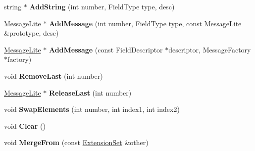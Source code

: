 \begin{DoxyCompactItemize}
string $\ast$ {\bfseries Add\+String} (int number, Field\+Type type, desc)
\item 
\mbox{\label{classgoogle_1_1protobuf_1_1internal_1_1ExtensionSet_a9d4628d61e8ce2185a6bf0b15790b70d}} 
\hyperlink{classgoogle_1_1protobuf_1_1MessageLite}{Message\+Lite} $\ast$ {\bfseries Add\+Message} (int number, Field\+Type type, const \hyperlink{classgoogle_1_1protobuf_1_1MessageLite}{Message\+Lite} \&prototype, desc)
\item 
\mbox{\label{classgoogle_1_1protobuf_1_1internal_1_1ExtensionSet_a65418097b2b71f955ccd96550b2a1482}} 
\hyperlink{classgoogle_1_1protobuf_1_1MessageLite}{Message\+Lite} $\ast$ {\bfseries Add\+Message} (const Field\+Descriptor $\ast$descriptor, Message\+Factory $\ast$factory)
\item 
\mbox{\label{classgoogle_1_1protobuf_1_1internal_1_1ExtensionSet_ad79bdb6c9fdba35930319dd8f37d0400}} 
void {\bfseries Remove\+Last} (int number)
\item 
\mbox{\label{classgoogle_1_1protobuf_1_1internal_1_1ExtensionSet_a670af2062090115f594a8a3a927669f1}} 
\hyperlink{classgoogle_1_1protobuf_1_1MessageLite}{Message\+Lite} $\ast$ {\bfseries Release\+Last} (int number)
\item 
\mbox{\label{classgoogle_1_1protobuf_1_1internal_1_1ExtensionSet_a50094ec3ece934b332fef9cbc9d24ef1}} 
void {\bfseries Swap\+Elements} (int number, int index1, int index2)
\item 
\mbox{\label{classgoogle_1_1protobuf_1_1internal_1_1ExtensionSet_a3f24f0713275a4b543ed018af58919d7}} 
void {\bfseries Clear} ()
\item 
\mbox{\label{classgoogle_1_1protobuf_1_1internal_1_1ExtensionSet_a7a7c466b212c6c3b2e3b5776d64be9f1}} 
void {\bfseries Merge\+From} (const \hyperlink{classgoogle_1_1protobuf_1_1internal_1_1ExtensionSet}{Extension\+Set} \&other)
\item 

\end{DoxyCompactItemize}

